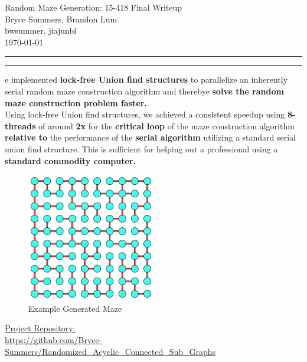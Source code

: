 \documentclass[11pt]{article}
\newcommand{\question}[2] {\vspace{.25in} \hrule\vspace{0.5em}
\noindent{\bf #1: #2} \vspace{0.5em}
\hrule \vspace{.10in}}
\newcommand{\myname}{Bryce Summers, Brandon Lum}
\newcommand{\myandrew}{bwsummer, jiajunbl}
\begin{document}
\medskip                        %

\thispagestyle{plain}
\begin{center}                  %
{\Large Random Maze Generation: 15-418 Final Writeup} \\
\myname \\
\myandrew \\

\today \\
\end{center}


\question{Abstract}

We implemented \textbf{lock-free Union find structures} to parallelize an inherently serial random maze construction algorithm and therebye \textbf{solve the random maze construction problem faster.}\\

Using lock-free Union find structures, we achieved a consistent speedup using \textbf{8-threads} of around \textbf{2x} for the \textbf{critical loop} of the maze construction algorithm \textbf{relative to} the performance of the \textbf{serial algorithm} utilizing a standard serial union find structure. This is sufficient for helping out a professional using a \textbf{standard commodity computer.}
\\

\begin{figure}[h]
\centering
\includegraphics[width=0.5\textwidth]{Lattice2}
\caption{Example Generated Maze}
\label{fig:TitlePage}
\end{figure}

\href{https://github.com/Bryce-Summers/Randomized_Acyclic_Connected_Sub_Graphs}{Project Repository:}\\
\url{https://github.com/Bryce-Summers/Randomized_Acyclic_Connected_Sub_Graphs} 
\end{document}
